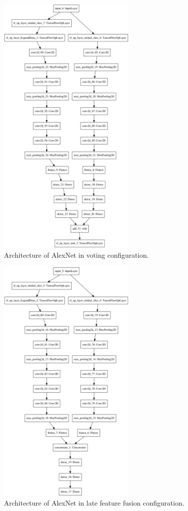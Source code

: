 \documentclass{l4proj}
\begin{document}
\begin{appendices}
\begin{figure}[ht]
  \centering
  \includegraphics[width=0.6\textwidth]{images/models/keras/voting.png}
  \caption{Architecture of AlexNet in voting configuration.}
\end{figure}

\begin{figure}[ht]
  \centering
  \includegraphics[width=0.6\textwidth]{images/models/keras/fusion.png}
  \caption{Architecture of AlexNet in late feature fusion configuration.}
\end{figure}


\end{appendices}
\end{document}
